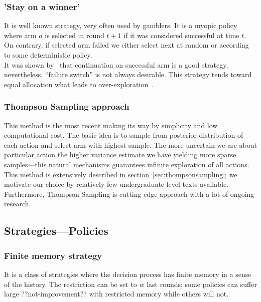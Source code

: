 \documentclass[12pt, a4paper, pdflatex, leqno]{report}
\begin{document}
\subsubsection{'Stay on a winner'}
It is well known strategy, very often used by gamblers. It is a myopic policy where arm $a$ is selected in round $t+1$ if it was considered successful at time $t$. On contrary, if selected arm failed we either select next at random or according to some deterministic policy.\\
It was shown by~\citep{berry+firstedt} that continuation on successful arm is a good strategy, nevertheless, ``failure switch'' is not always desirable. This strategy tends toward equal allocation what leads to over-exploration~\citep{Scott:2010:MBL:1944422.1944432}.\\


\subsubsection{Thompson Sampling approach}
This method is the most recent making its way by simplicity and low computational cost. The basic idea is to sample from posterior distribution of each action and select arm with highest sample. The more uncertain we are about particular action the higher variance estimate we have yielding more sparse samples---this natural mechanisms guarantees infinite exploration of all actions.\\
This method is extensively described in section~\ref{sec:thompsonsampling}; we motivate our choice by relatively few undergraduate level texts available. Furthermore, Thompson Sampling is cutting edge approach with a lot of ongoing research.\\


\subsection{Strategies---Policies}


\subsubsection{Finite memory strategy}
It is a class of strategies where the decision process has finite memory in a sense of the history. The restriction can be set to $w$ last rounds; some policies can suffer large ??not-improvement?? with restricted memory while others will not.\\
\end{document}
